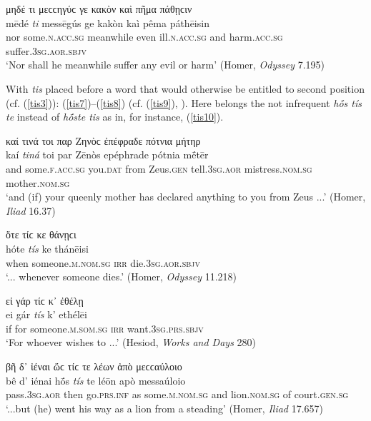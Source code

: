 \begin{exe}
\ex μηδέ τι μεϲϲηγύϲ γε κακὸν καὶ πῆμα πάθῃϲιν\\
\gll mēdé \emph{ti} messēgús ge kakòn kaì pêma páthēisin\\
nor some.\textsc{n.acc.sg} meanwhile even ill.\textsc{n.acc.sg} and harm.\textsc{acc.sg} suffer.\textsc{3sg.aor.sbjv}\\
\trans `Nor shall he meanwhile suffer any evil or harm' (Homer, \textit{Odyssey} 7.195)
\label{tis6}
\end{exe}

With \textit{tis} placed before a word that would otherwise be entitled to second position (cf. (\ref{tis3})): (\ref{tis7})--(\ref{tis8}) (cf. (\ref{tis9}), \citealp[559]{Peppmueller1890}). Here belongs the not infrequent \textit{hṓs tís te} instead of \textit{hṓste tis} as in, for instance, (\ref{tis10}).

\begin{exe}
\ex καί τινά τοι παρ Ζηνὸϲ ἐπέφραδε πότνια μήτηρ\\
\gll kaí \emph{tiná} toi par Zēnòs epéphrade pótnia mḗtēr\\
and some.\textsc{f.acc.sg} you.\textsc{dat} from Zeus.\textsc{gen} tell.\textsc{3sg.aor} mistress.\textsc{nom.sg} mother.\textsc{nom.sg}\\
\trans `and (if) your queenly mother has declared anything to you from Zeus ...' (Homer, \textit{Iliad} 16.37)
\label{tis7}
\end{exe}

\begin{exe}
\ex ὅτε τίϲ κε θάνῃϲι\\
\gll hóte \emph{tís} ke thánēisi\\
when someone.\textsc{m.nom.sg} \textsc{irr} die.\textsc{3sg.aor.sbjv}\\
\trans `... whenever someone dies.' (Homer, \textit{Odyssey} 11.218)
\label{tis8}
\end{exe}

\begin{exe}
\ex εἰ γάρ τίϲ κ᾽ ἐθέλῃ\\
\gll ei gár \emph{tís} k' ethélēi\\
if for someone.\textsc{m.som.sg} \textsc{irr} want.\textsc{3sg.prs.sbjv}\\
\trans `For whoever wishes to ...' (Hesiod, \textit{Works and Days} 280)
\label{tis9}
\end{exe}

\begin{exe}
\ex βῆ δ᾽ ἰέναι ὥϲ τίϲ τε λέων ἀπὸ μεϲϲαύλοιο\\
\gll bê d' iénai hṓs \emph{tís} te léōn apò messaúloio\\
pass.\textsc{3sg.aor} then go.\textsc{prs.inf} as some.\textsc{m.nom.sg} and lion.\textsc{nom.sg} of court.\textsc{gen.sg}\\
\trans `...but (he) went his way as a lion from a steading' (Homer, \textit{Iliad} 17.657)
\label{tis10}
\end{exe}

